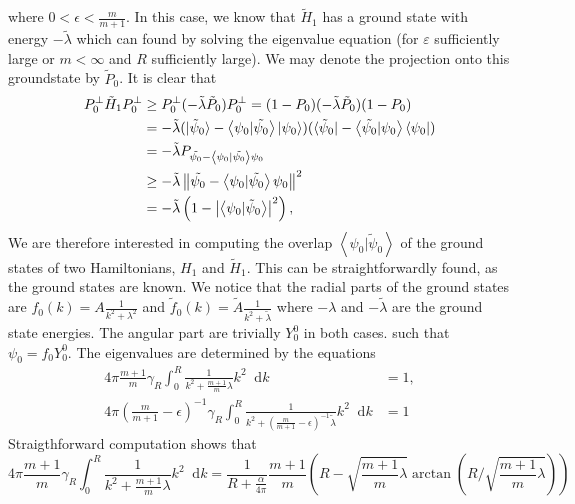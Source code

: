 \documentclass[a4paper,11pt]{article}
\newcommand{\norm}[1]{\left\lVert #1 \right\rVert}
\newcommand{\abs}[1]{\left\lvert #1 \right\rvert}
\renewcommand{\braket}[1]{\left\langle#1\right\rangle}
\newcommand*\diff{\mathop{}\!\mathrm{d}}
\numberwithin{equation}{section}
\begin{document}
where $ 0<\epsilon<\frac{m}{m+1} $. In this case, we know that $ \tilde{H}_1 $ has a ground state with energy $ -\tilde{\lambda} $ which can found by solving the eigenvalue equation (for $ \varepsilon $ sufficiently large or $ m<\infty $ and $ R $ sufficiently large). We may denote the projection onto this groundstate by $ \tilde{P}_0 $. It is clear that \begin{equation}
\begin{aligned}
P_0^\perp\tilde{H}_1P_0^\perp&\geq P_0^\perp(-\tilde{\lambda}\tilde{P}_0)P_0^\perp=(1-P_0)(-\tilde{\lambda}\tilde{P}_0)(1-P_0)\\
&=-\tilde{\lambda}(\ket{\tilde{\psi}_0}-\braket{\psi_0|\tilde{\psi_0}}\ket{\psi_0})(\bra{\tilde{\psi}_0}-\braket{\tilde{\psi_0}|\psi_0}\bra{\psi_0})\\
&=-\tilde{\lambda} P_{\tilde{\psi_0}-\braket{\psi_0|\tilde{\psi_0}}\psi_0}\\
&\geq-\tilde{\lambda}\norm{\tilde{\psi_0}-\braket{\psi_0|\tilde{\psi_0}}\psi_0}^2\\
&=-\tilde{\lambda}\left(1-\abs{\braket{\psi_0|\tilde{\psi}_0}}^2\right),
\end{aligned}
\end{equation}
We are therefore interested in computing the overlap $ \braket{\psi_0|\tilde{\psi}_0} $ of the ground states of two Hamiltonians, $ H_1 $ and $ \tilde{H}_1 $. This can be straightforwardly found, as the ground states are known.
We notice that the radial parts of the ground states are $ f_0(k)=A\frac{1}{k^2+\lambda^2} $ and $ \tilde{f}_0(k)=\tilde{A}\frac{1}{k^2+\tilde{\lambda}} $ where $ -\lambda $ and $ -\tilde{\lambda} $ are the ground state energies. The angular part are trivially $ Y_0^0 $ in both cases. such that $ \psi_0=f_0Y_0^0 $. The eigenvalues are determined by the equations\begin{equation}
\begin{aligned}
4\pi\frac{m+1}{m}\gamma_R\int_{0}^{R}\frac{1}{k^2+\frac{m+1}{m}\lambda} k^2\diff k&=1,\\
4\pi\left(\frac{m}{m+1}-\epsilon\right)^{-1}\gamma_R\int_{0}^{R}\frac{1}{k^2+\left(\frac{m}{m+1}-\epsilon\right)^{-1}\tilde{\lambda}} k^2\diff k&=1
\end{aligned}
\end{equation}
Straigthforward computation shows that \begin{equation}
4\pi\frac{m+1}{m}\gamma_R\int_{0}^{R}\frac{1}{k^2+\frac{m+1}{m}\lambda} k^2\diff k=\frac{1}{R+\frac{\alpha}{4\pi}}\frac{m+1}{m}\left(R-\sqrt{\frac{m+1}{m}\lambda}\arctan\left(R\Bigg/\sqrt{\frac{m+1}{m}\lambda}\right)\right)
\end{equation}
\end{document}
